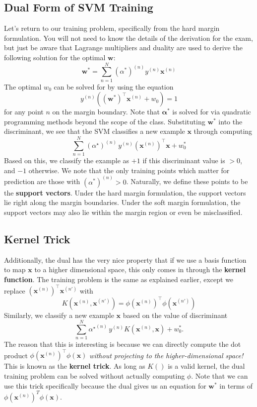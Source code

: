\documentclass[11pt, letterpaper]{article}
\theoremstyle{definition}
\theoremstyle{plain}
\begin{document}
\subsection{Dual Form of SVM Training}
Let's return to our training problem, specifically from the hard margin formulation. You will not need to know the details of the derivation for the exam, but just be aware that Lagrange multipliers and duality are used to derive the following solution for the optimal $\bm w$:
\[\bm{w}^* = \sum_{n=1}^N (\alpha^*)^{(n)}y^{(n)}\bm{x}^{(n)}\]
The optimal $w_0$ can be solved for by using the equation
\[y^{(n)}((\bm{w}^*)^\top\bm{x}^{(n)} + w_0) = 1\]
for any point $n$ on the margin boundary. Note that $\bm{\alpha}^*$ is solved for via quadratic programming methods beyond the scope of the class. Substituting $\bm{w}^*$ into the discriminant, we see that the SVM classifies a new example $\bm{x}$ through computing
\[\sum_{n=1}^N (\alpha^\star)^{(n)} \,y^{(n)} (\bm{x}^{(n)})^\top \bm{x}+w_0^*\]
Based on this, we classify the example as $+1$ if this discriminant value is $>0$, and $-1$ otherwise. We note that the only training points which matter for prediction are those with $(\alpha^*)^{(n)} > 0$. Naturally, we define these points to be the \textbf{support vectors}. Under the hard margin formulation, the support vectors lie right along the margin boundaries. Under the soft margin formulation, the support vectors may also lie within the margin region or even be misclassified.

\subsection{Kernel Trick}

Additionally, the dual has the very nice property that
if we use a basis function to map $\bm{x}$ to a higher dimensional space, this only comes in through the \textbf{kernel function}. The training problem is the same as explained earlier, except we replace
$(\bm{x}^{(n)})^\top \bm{x}^{(n')}$ with
\[K(\bm{x}^{(n)},\bm{x}^{(n')}) = \phi(\bm{x}^{(n)})^\top\phi(\bm{x}^{(n')})\]
Similarly, we classify a new example $\bm{x}$
based on the value of discriminant
\[\sum_{n=1}^N{\alpha^\star}^{(n)} \,y^{(n)}K(\bm{x}^{(n)},\bm{x}) +w_0^*.\]
The reason that this is interesting
is because we can directly compute the dot product
$\phi(\bm{x}^{(n)})^\top\phi(\bm{x})$
{\em without projecting to the higher-dimensional space!}
This is known as the \textbf{kernel trick}. As long as $K()$ is a valid kernel, the dual training problem can be solved without actually computing $\phi$. Note that we can use this trick specifically because the dual gives us an equation for $\bm{w}^*$ in terms of $\phi(\bm{x}^{(n)})^T\phi(\bm{x})$.
\end{document}
